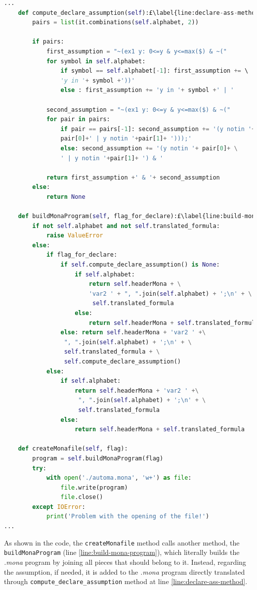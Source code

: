 \begin{lstlisting}[language=Python, style=Python, escapechar = £, label={code:ltlf2dfa-createmona-method}, caption={The \texttt{createMonafile} method.}]
...
    def compute_declare_assumption(self):£\label{line:declare-ass-method}£
        pairs = list(it.combinations(self.alphabet, 2))

        if pairs:
            first_assumption = "~(ex1 y: 0<=y & y<=max($) & ~("
            for symbol in self.alphabet:
                if symbol == self.alphabet[-1]: first_assumption += \ 
                'y in '+ symbol +'))'
                else : first_assumption += 'y in '+ symbol +' | '

            second_assumption = "~(ex1 y: 0<=y & y<=max($) & ~("
            for pair in pairs:
                if pair == pairs[-1]: second_assumption += '(y notin '+ \
                pair[0]+' | y notin '+pair[1]+ ')));'
                else: second_assumption += '(y notin '+ pair[0]+ \
                ' | y notin '+pair[1]+ ') & '

            return first_assumption +' & '+ second_assumption
        else:
            return None

    def buildMonaProgram(self, flag_for_declare):£\label{line:build-mona-program}£
        if not self.alphabet and not self.translated_formula:
            raise ValueError
        else:
            if flag_for_declare:
                if self.compute_declare_assumption() is None:
                    if self.alphabet:
                        return self.headerMona + \
                        'var2 ' + ", ".join(self.alphabet) + ';\n' + \
                         self.translated_formula
                    else:
                        return self.headerMona + self.translated_formula
                else: return self.headerMona + 'var2 ' +\
                 ", ".join(self.alphabet) + ';\n' + \
                 self.translated_formula + \
                 self.compute_declare_assumption()
            else:
                if self.alphabet:
                    return self.headerMona + 'var2 ' +\
                     ", ".join(self.alphabet) + ';\n' + \
                     self.translated_formula
                else:
                    return self.headerMona + self.translated_formula

    def createMonafile(self, flag):
        program = self.buildMonaProgram(flag)
        try:
            with open('./automa.mona', 'w+') as file:
                file.write(program)
                file.close()
        except IOError:
            print('Problem with the opening of the file!')
...            
\end{lstlisting}
As shown in the code, the \texttt{createMonafile} method calls another method, the \texttt{buildMonaProgram} (line \ref{line:build-mona-program}), which literally builds the \textit{.mona} program by joining all pieces that should belong to it. Instead, regarding the \declare assumption, if needed, it is added to the \textit{.mona} program directly translated through \texttt{compute\_declare\_assumption} method at line \ref{line:declare-ass-method}.
